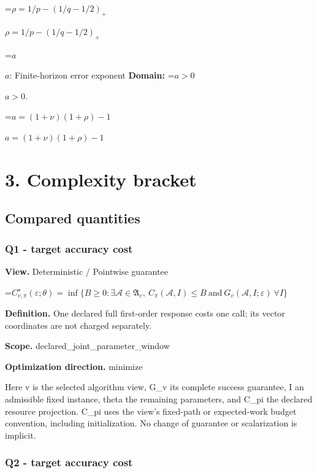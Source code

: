 \documentclass[10pt,a4paper]{article}
\newcommand{\AtlasMath}[1]{\par\begingroup\centering\setbox0=\hbox{$\displaystyle #1$}\ifdim\wd0>1.4\linewidth\typeout{ATLAS WIDE FORMULA: \the\wd0}\fi\ifdim\wd0>\linewidth\resizebox{\linewidth}{!}{\box0}\else\box0\fi\par\endgroup}
\newcommand{\AtlasInlineMath}[1]{\begingroup\setbox0=\hbox{$#1$}\ifdim\wd0>.4\linewidth\endgroup\AtlasMath{#1}\else\endgroup$#1$\fi}
\begin{document}
\AtlasInlineMath{\rho=1/p-(1/q-1/2)_+}



\AtlasInlineMath{a}: Finite-horizon error exponent \textbf{Domain:} \AtlasInlineMath{a>0}.



\AtlasInlineMath{a=(1+\nu)(1+\rho)-1}



\section{3. Complexity bracket}


\subsection{Compared quantities}


\subsubsection{Q1 - target accuracy cost}


\textbf{View.} Deterministic / Pointwise guarantee



\AtlasMath{C^\star_{v,\pi}(\varepsilon;\theta)=\inf\{B\ge0:\exists\mathcal A\in\mathfrak A_v,\ C_\pi(\mathcal A,I)\le B\ \text{and}\ G_v(\mathcal A,I;\varepsilon)\ \forall I\}}


\textbf{Definition.} One declared full first-order response costs one call; its vector coordinates are not charged separately.



\textbf{Scope.} declared\_joint\_parameter\_window



\textbf{Optimization direction.} minimize



Here v is the selected algorithm view, G\_v its complete success guarantee, I an admissible fixed instance, theta the remaining parameters, and C\_pi the declared resource projection. C\_pi uses the view's fixed-path or expected-work budget convention, including initialization. No change of guarantee or scalarization is implicit.



\subsubsection{Q2 - target accuracy cost}
\end{document}
